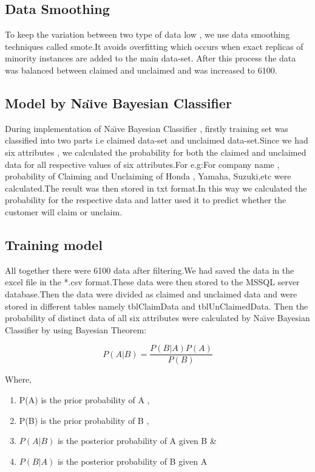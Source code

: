\subsection{Data Smoothing}
To keep the variation between two type of data low , we use data smoothing techniques called \acs{smote}.It avoids overfitting which occurs when exact replicas of minority instances are added to the main data-set. After this process the data was balanced between claimed and unclaimed and was increased to 6100.
\subsection{Model by Na\"{\i}ve Bayesian Classifier}
During implementation of Na\"{\i}ve Bayesian Classifier , firstly training set was classified into two parts i.e claimed data-set and unclaimed data-set.Since we had six attributes , we calculated the probability for both the claimed and unclaimed data for all respective values of six attributes.For e.g:For company name , probability of Claiming and Unclaiming of Honda , Yamaha, Suzuki,etc were calculated.The result was then stored in txt format.In this way we calculated the probability for
the respective data and latter used it to predict whether the customer will claim or unclaim.
\subsection{Training model}
All together there were 6100 data  after filtering.We had saved the data in the excel file in the *.csv format.These data were then stored to the MSSQL server database.Then the data were divided as  claimed and unclaimed data and were stored in different tables namely tblClaimData and tblUnClaimedData. Then the probability of distinct data of all six attributes were calculated by Na\"{\i}ve Bayesian Classifier by using Bayesian Theorem:
\par\[P(A|B)=\frac{P(B|A)P(A)}{P(B)}\]

Where,
\begin{enumerate}
\item P(A) is the prior probability of A , 
\item P(B) is the prior probability of B ,
\item $P(A | B)$ is the posterior probability of A given B \&
\item $P(B | A)$ is the posterior probability of B given A
\end{enumerate}


